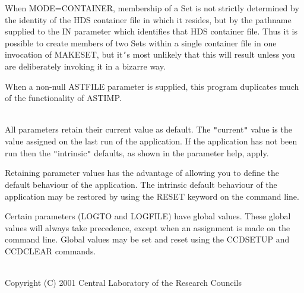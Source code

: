 \documentclass[twoside,11pt]{article}
\newcommand{\htmlref}[2]{#1}
\renewcommand{\_}{\texttt{\symbol{95}}}
\newcommand{\routine}[1]{{\sc #1}}
\newcommand{\xroutine}[1]{\htmlref{{\sc #1}}{#1}}
\newcommand{\sstdiytopic}[2]{\item[#1:] \mbox{} \\[1.3ex] #2}
\newcommand{\sstitem}{\item}
\newcommand{\sstdiytopic}[2]{\item[{#1:}] #2 }
\newcommand{\sstitem}{\item}
\begin{document}
{{{         \sstitem
         When MODE=CONTAINER, membership of a Set is not strictly
         determined by the identity of the HDS container file in which
         it resides, but by the pathname supplied to the IN parameter
         which identifies that HDS container file.  Thus it is possible
         to create members of two Sets within a single container file
         in one invocation of \routine{MAKESET}, but it{\tt '}s most unlikely that this
         will result unless you are deliberately invoking it in a
         bizarre way.

         \sstitem
         When a non-null ASTFILE parameter is supplied, this program
         duplicates much of the functionality of \xroutine{ASTIMP}.
      }
   }
   \sstdiytopic{
      Behaviour of Parameters
   }{
      All parameters retain their current value as default. The
      {\tt "}current{\tt "} value is the value assigned on the last run of the
      application. If the application has not been run then the
      {\tt "}intrinsic{\tt "} defaults, as shown in the parameter help, apply.

      Retaining parameter values has the advantage of allowing you to
      define the default behaviour of the application. The intrinsic
      default behaviour of the application may be restored by using the
      RESET keyword on the command line.

      Certain parameters (LOGTO and LOGFILE) have global
      values. These global values will always take precedence, except
      when an assignment is made on the command line. Global values may
      be set and reset using the \xroutine{CCDSETUP} and \xroutine{CCDCLEAR} commands.
   }
   \sstdiytopic{
      Copyright
   }{
      Copyright (C) 2001 Central Laboratory of the Research Councils
   }
}
\end{document}
